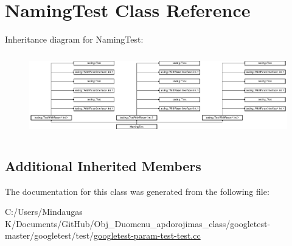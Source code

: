 \hypertarget{class_naming_test}{}\section{Naming\+Test Class Reference}
\label{class_naming_test}
Inheritance diagram for Naming\+Test\+:\begin{figure}[H]
\begin{center}
\leavevmode
\includegraphics[height=3.572568cm]{de/d70/class_naming_test}
\end{center}
\end{figure}
\subsection*{Additional Inherited Members}


The documentation for this class was generated from the following file\+:\begin{DoxyCompactItemize}
\item 
C\+:/\+Users/\+Mindaugas K/\+Documents/\+Git\+Hub/\+Obj\+\_\+\+Duomenu\+\_\+apdorojimas\+\_\+class/googletest-\/master/googletest/test/\mbox{\hyperlink{googletest-master_2googletest_2test_2googletest-param-test-test_8cc}{googletest-\/param-\/test-\/test.\+cc}}\end{DoxyCompactItemize}

